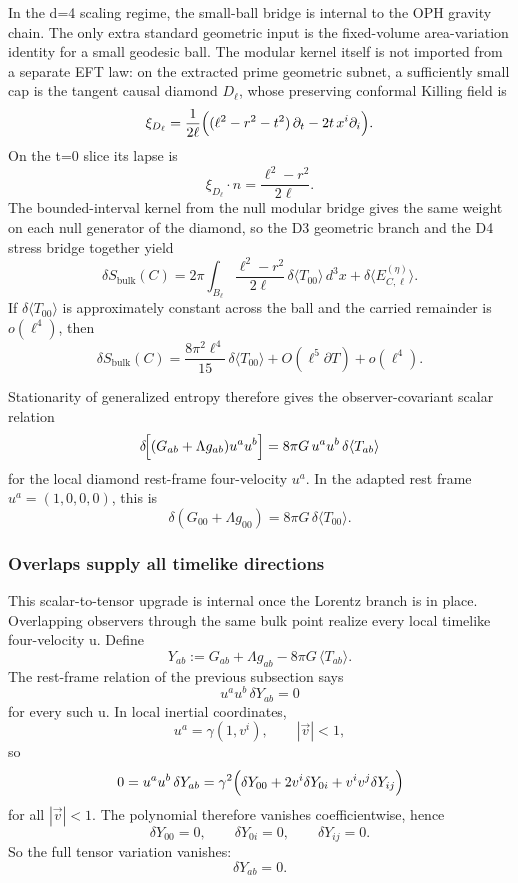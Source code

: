 In the d=4 scaling regime, the small-ball bridge is internal to the OPH gravity chain. The only extra standard geometric input is the fixed-volume area-variation identity for a small geodesic ball. The modular kernel itself is not imported from a separate EFT law: on the extracted prime geometric subnet, a sufficiently small cap is the tangent causal diamond \(D_\ell\), whose preserving conformal Killing field is
\[
\xi_{D_\ell}
=
\frac{1}{2\ell}
\Bigl((\ell^2-r^2-t^2)\,\partial_t-2t\,x^i\partial_i\Bigr).
\]
On the t=0 slice its lapse is
\[
\xi_{D_\ell}\!\cdot n=\frac{\ell^2-r^2}{2\ell}.
\]
The bounded-interval kernel from the null modular bridge gives the same weight on each null generator of the diamond, so the D3 geometric branch and the D4 stress bridge together yield
\[
\delta S_{\mathrm{bulk}}(C)
=
2\pi\int_{B_\ell}\frac{\ell^2-r^2}{2\ell}\,\delta\langle T_{00}\rangle\,d^3x
+
\delta\langle E^{(\eta)}_{C,\ell}\rangle.
\]
If \(\delta\langle T_{00}\rangle\) is approximately constant across the ball and the carried remainder is \(o(\ell^4)\), then
\[
\delta S_{\mathrm{bulk}}(C)
=
\frac{8\pi^2\ell^4}{15}\,\delta\langle T_{00}\rangle
+O(\ell^5\partial T)+o(\ell^4).
\]

Stationarity of generalized entropy therefore gives the observer-covariant scalar relation
\[
\delta\!\Bigl[(G_{ab}+\Lambda g_{ab})u^a u^b\Bigr]
=
8\pi G\,u^a u^b\,\delta\langle T_{ab}\rangle
\]
for the local diamond rest-frame four-velocity \(u^a\). In the adapted rest frame \(u^a=(1,0,0,0)\), this is
\[
\delta\!\left(G_{00}+\Lambda g_{00}\right)=8\pi G\,\delta\langle T_{00}\rangle.
\]

\subsubsection{Overlaps supply all timelike directions}\label{57-overlaps-supply-all-timelike-directions}

This scalar-to-tensor upgrade is internal once the Lorentz branch is in place. Overlapping observers through the same bulk point realize every local timelike four-velocity u. Define
\[
Y_{ab}:=G_{ab}+\Lambda g_{ab}-8\pi G\,\langle T_{ab}\rangle.
\]
The rest-frame relation of the previous subsection says
\[
u^a u^b\,\delta Y_{ab}=0
\]
for every such u. In local inertial coordinates,
\[
u^a=\gamma(1,v^i),
\qquad
|\vec v|<1,
\]
so
\[
0
=
u^a u^b\,\delta Y_{ab}
=
\gamma^2\Bigl(\delta Y_{00}+2v^i\delta Y_{0i}+v^iv^j\delta Y_{ij}\Bigr)
\]
for all \(|\vec v|<1\). The polynomial therefore vanishes coefficientwise, hence
\[
\delta Y_{00}=0,\qquad
\delta Y_{0i}=0,\qquad
\delta Y_{ij}=0.
\]
So the full tensor variation vanishes:
\[
\delta Y_{ab}=0.
\]

